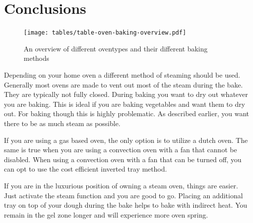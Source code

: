 \section{Conclusions}

\begin{figure}[!htb]
  \texttt{[image: tables/table-oven-baking-overview.pdf]}
  \caption{An overview of different oventypes and their different baking methods}
\end{figure}

Depending on your home oven a different method
of steaming should be used. Generally most ovens
are made to vent out most of the steam during the
bake. They are typically not fully closed. During
baking you want to dry out whatever you are baking.
This is ideal if you are baking vegetables and
want them to dry out. For baking though this is
highly problematic. As described earlier, you
want there to be as much steam as possible.

If you are using a gas based oven, the only option
is to utilize a dutch oven. The same is true when you
are using a convection oven with a fan that
cannot be disabled. When using a convection
oven with a fan that can be turned off, you can
opt to use the cost efficient inverted tray
method.

If you are in the luxurious
position of owning a steam oven, things are easier.
Just activate the steam function and you are
good to go. Placing an additional tray on top of your
dough during the bake helps to bake with indirect
heat. You remain in the gel zone longer and
will experience more oven spring.
